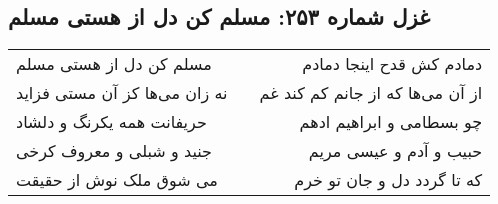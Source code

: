 \begin{center}
\section*{غزل شماره ۲۵۳: مسلم کن دل از هستی مسلم}
\label{sec:253}
\begin{longtable}{l p{0.5cm} r}
مسلم کن دل از هستی مسلم
&&
دمادم کش قدح اینجا دمادم
\\
نه زان می‌ها کز آن مستی فزاید
&&
از آن می‌ها که از جانم کم کند غم
\\
حریفانت همه یکرنگ و دلشاد
&&
چو بسطامی و ابراهیم ادهم
\\
جنید و شبلی و معروف کرخی
&&
حبیب و آدم و عیسی مریم
\\
می شوق ملک نوش از حقیقت
&&
که تا گردد دل و جان تو خرم
\\
\end{longtable}
\end{center}
